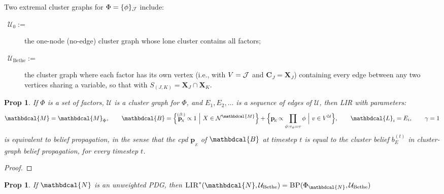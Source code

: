 \documentclass{article}
\theoremstyle{plain}
\newtheorem{prop}[theorem]{Prop}
\theoremstyle{definition}
\theoremstyle{remark}
\newcommand\mat[1]{\mathbf{#1}}
\newcommand{\bp}[1][L]{\mat{p}_{\!_{#1}\!}}
\newcommand{\N}{\mathcal N}
\newcommand{\dg}[1]{\mathbdcal{#1}}
\newcommand{\bundle}{\mathbin{+}}
\newcommand{\PDGof}[1]{{\dg M}_{#1}}
\newcommand{\FGof}[1]{\Phi_{{#1}}}
\begin{document}
Two extremal cluster graphs for $\Phi = \{\phi\}_{\cal J}$ include:
\begin{description}
	\item[{~$\mathcal U_0 :=$}] the one-node (no-edge) cluster graph  whose lone cluster contains all factors;
	\item[{~$\mathcal U_{\mathrm{Bethe}} :=$~}] the cluster graph where each factor has its own vertex (i.e., with $V = \cal J$ and $\mat C_J = \mat X_J$) containing every edge between any two vertices sharing a variable, so that with $S_{(J,K)} = \mat X_J \cap \mat X_K$.
\end{description}


\begin{defn}
\end{defn}

\clearpage
\begin{prop}
	If $\Phi$ is a set of factors, $\mathcal U$ is a cluster graph for $\Phi$, and $E_1, E_2, \ldots$ is a sequence of edges of $\mathcal U$, then LIR with parameters:
	\begin{equation*}
		\dg M = \PDGof{\Phi},
		\qquad \dg B = \Big\{ \overset{(\beta :  )}{\bp[X]} \propto 1 ~\Big|~ X \in \N^{\dg M} \Big\} \bundle
			\Big\{ \bp[E] \propto \prod_{\phi : v_\phi = v} \phi  ~\Big|~ v \in V^{\mathcal U} \Big\},
		\qquad \dg L_i = E_i,
		\qquad \gamma = 1
	\end{equation*}
	is equivalent to belief propagation, in the sense that the cpd $\bp[E]$ of $\dg B$ at timestep $t$ is equal to the cluster belief $b^{(t)}_{E}$ in cluster-graph belief propagation, for every timestep $t$.
\end{prop}
\begin{proof}

\end{proof}


\begin{prop}
	If $\dg N$ is an unweighted PDG, then
	$
		\textsc{LIR}^*(\dg N, \mathcal U_{\mathrm{Bethe}})
			 = \textsc{BP}( \FGof{\dg N}, \mathcal U_{\mathrm{Bethe}} )
	$
\end{prop}
\end{document}
